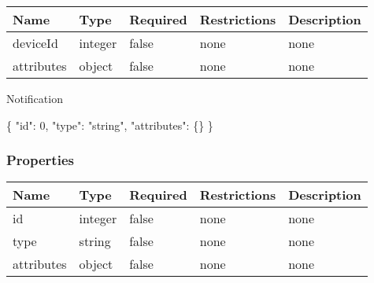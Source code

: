 \documentclass[
]{article}
\newenvironment{Shaded}{}{}
\newcommand{\DataTypeTok}[1]{\textcolor[rgb]{0.56,0.13,0.00}{#1}}
\newcommand{\DecValTok}[1]{\textcolor[rgb]{0.25,0.63,0.44}{#1}}
\newcommand{\FunctionTok}[1]{\textcolor[rgb]{0.02,0.16,0.49}{#1}}
\newcommand{\StringTok}[1]{\textcolor[rgb]{0.25,0.44,0.63}{#1}}
\begin{document}
\begin{longtable}[]{@{}lllll@{}}
\toprule
Name & Type & Required & Restrictions & Description\tabularnewline
\midrule
\endhead
deviceId & integer & false & none & none\tabularnewline
attributes & object & false & none & none\tabularnewline
\bottomrule
\end{longtable}

Notification

\begin{Shaded}
\begin{Highlighting}[]
\FunctionTok{\{}
  \DataTypeTok{"id"}\FunctionTok{:} \DecValTok{0}\FunctionTok{,}
  \DataTypeTok{"type"}\FunctionTok{:} \StringTok{"string"}\FunctionTok{,}
  \DataTypeTok{"attributes"}\FunctionTok{:} \FunctionTok{\{\}}
\FunctionTok{\}}
\end{Highlighting}
\end{Shaded}

\hypertarget{properties-4}{%
\subsubsection{Properties}\label{properties-4}}

\begin{longtable}[]{@{}lllll@{}}
\toprule
Name & Type & Required & Restrictions & Description\tabularnewline
\midrule
\endhead
id & integer & false & none & none\tabularnewline
type & string & false & none & none\tabularnewline
attributes & object & false & none & none\tabularnewline
\bottomrule
\end{longtable}
\end{document}
